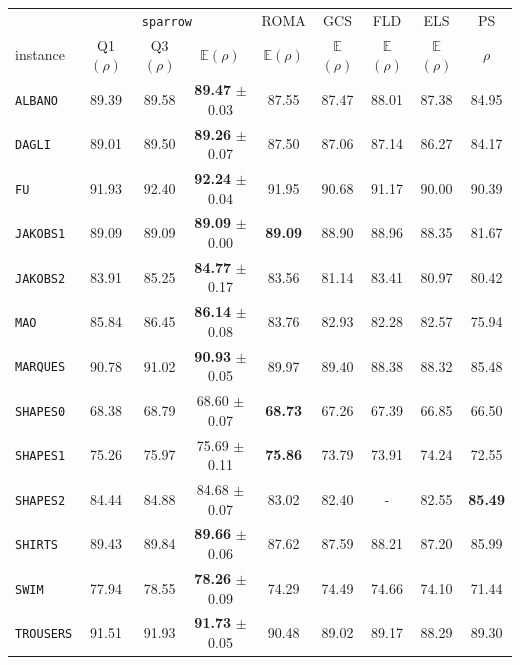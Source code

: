 \begin{table}[!tbp]
\begin{tabular}{|l|cc|c|cccc|c|}
   \hline
& \multicolumn{3}{c|}{\texttt{sparrow}} & ROMA & GCS& FLD & ELS & PS \\
instance & {Q1$(\rho)$} & {Q3$(\rho)$} & { $\mathbb{E}$$(\rho)$} & { $\mathbb{E}$$(\rho)$} & { $\mathbb{E}$$(\rho)$} & { $\mathbb{E}$$(\rho)$} & { $\mathbb{E}$$(\rho)$} & {$\rho$} \\ \hline
\texttt{ALBANO} &89.39&89.58& \textbf{89.47} \scriptsize$\pm$0.03& 87.55 & 87.47 & 88.01 & 87.38 & 84.95 \\
\texttt{DAGLI} &89.01&89.50& \textbf{89.26} \scriptsize$\pm$0.07& 87.50 & 87.06 & 87.14 & 86.27 & 84.17 \\
\texttt{FU} &91.93&92.40& \textbf{92.24} \scriptsize$\pm$0.04& 91.95 & 90.68 & 91.17 & 90.00 & 90.39 \\
\texttt{JAKOBS1} &89.09&89.09& \textbf{89.09} \scriptsize$\pm$0.00& \textbf{89.09} & 88.90 & 88.96 & 88.35 & 81.67 \\
\texttt{JAKOBS2} &83.91&85.25& \textbf{84.77} \scriptsize$\pm$0.17& 83.56 & 81.14 & 83.41 & 80.97 & 80.42 \\
\texttt{MAO} &85.84&86.45& \textbf{86.14} \scriptsize$\pm$0.08& 83.76 & 82.93 & 82.28 & 82.57 & 75.94 \\
\texttt{MARQUES} &90.78&91.02& \textbf{90.93} \scriptsize$\pm$0.05& 89.97 & 89.40 & 88.38 & 88.32 & 85.48 \\
\texttt{SHAPES0} &68.38&68.79&68.60 \scriptsize$\pm$0.07& \textbf{68.73} & 67.26 & 67.39 & 66.85 & 66.50 \\
\texttt{SHAPES1} &75.26&75.97&75.69 \scriptsize$\pm$0.11& \textbf{75.86} & 73.79 & 73.91 & 74.24 & 72.55 \\
\texttt{SHAPES2} &84.44&84.88&84.68 \scriptsize$\pm$0.07& 83.02 & 82.40 & - & 82.55 & \textbf{85.49} \\
\texttt{SHIRTS} &89.43&89.84& \textbf{89.66} \scriptsize$\pm$0.06& 87.62 & 87.59 & 88.21 & 87.20 & 85.99 \\
\texttt{SWIM} &77.94&78.55& \textbf{78.26} \scriptsize $\pm$0.09& 74.29 & 74.49 & 74.66 & 74.10 & 71.44 \\
\texttt{TROUSERS} &91.51&91.93& \textbf{91.73} \scriptsize$\pm$0.05& 90.48 & 89.02 & 89.17 & 88.29 & 89.30 \\
\hline
\end{tabular}


\end{table}
